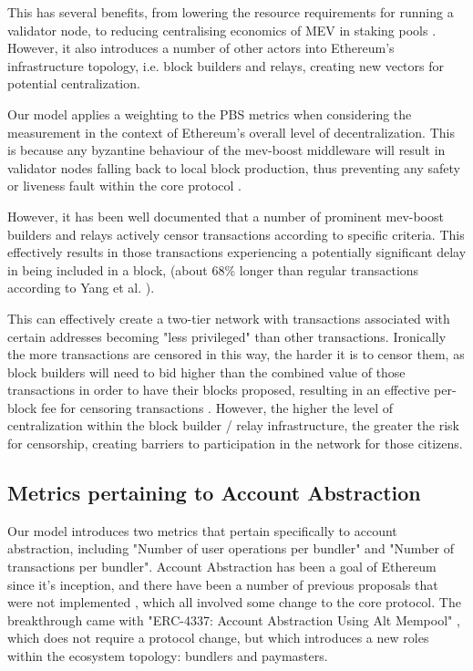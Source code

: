 \documentclass[conference]{IEEEtran}
\begin{document}
This has several benefits, from lowering the resource requirements for running a validator node, to reducing centralising economics of MEV in staking pools \cite{buterin2021}.  However, it also introduces a number of other actors into Ethereum's infrastructure topology, i.e. block builders and relays, creating new vectors for potential centralization.

Our model applies a weighting to the PBS metrics when considering the measurement in the context of Ethereum's overall level of decentralization.  This is because any byzantine behaviour of the mev-boost middleware will result in validator nodes falling back to local block production, thus preventing any safety or liveness fault within the core protocol \cite{hasu2022}.

However, it has been well documented \cite{labrys2022} that a number of prominent mev-boost builders and relays actively censor transactions according to specific criteria.  This effectively results in those transactions experiencing a potentially significant delay in being included in a block, (about 68\% longer than regular transactions according to Yang et al. \cite{yang2022sok}). 

This can effectively create a two-tier network with transactions associated with certain addresses becoming "less privileged" than other transactions.  Ironically the more transactions are censored in this way, the harder it is to censor them, as block builders will need to bid higher than the combined value of those transactions in order to have their blocks proposed, resulting in an effective per-block fee for censoring transactions \cite{buterin2022}.  However, the higher the level of centralization within the block builder / relay infrastructure, the greater the risk for censorship, creating barriers to participation in the network for those citizens.

\subsection{Metrics pertaining to Account Abstraction}

Our model introduces two metrics that pertain specifically to account abstraction, including "Number of user operations per bundler" and "Number of transactions per bundler". Account Abstraction has been a goal of Ethereum since it's inception, and there have been a number of previous proposals that were not implemented \cite{john2023, wilson2020, dietrichs2020}, which all involved some change to the core protocol.  The breakthrough came with "ERC-4337: Account Abstraction Using Alt Mempool" \cite{buterin2021B}, which does not require a protocol change, but which introduces a new roles within the ecosystem topology: bundlers and paymasters.
\end{document}
